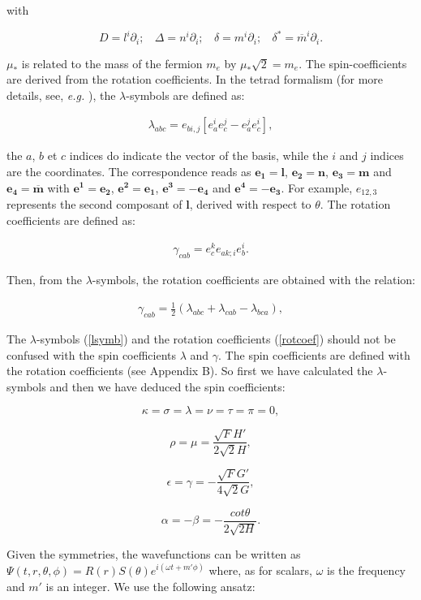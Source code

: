 \documentclass[twocolumn,amsmath,amssymb,prl,10pt,nofootinbib,superscriptaddress]{revtex4}
\def\be{\begin{equation}}
\def\ee{\end{equation}}
\def\bea{\begin{eqnarray}}
\def\eea{\end{eqnarray}}
\begin{document}
\noindent with

\be 
 D =l^i \partial _i; \ \ \ \   \Delta =n^i \partial _i; \ \ \ \   \delta =m^i \partial _i; \ \   \ \   \delta ^* = \overline{m}^i \partial _i.
 \label{operator}
 \ee
 
\noindent $\mu _*$ is related to the mass of the fermion $m_e$ by $\mu _* \sqrt{2} = m_e$. The spin-coefficients are derived from the rotation coefficients. In the tetrad formalism (for more details, see, {\it e.g.} \cite{Chandrasekhar:1985kt}), the $\lambda$-symbols are defined as: 


\bea 
\lambda  _{abc} = e_{b i, j} [ e_a^i e_c^j - e_a^j e_c^i ],
\label{lsymb}
 \eea
 
\noindent the $a$, $b$ et $c$ indices do indicate the vector of the basis, while the $i$ and $j$ indices are the coordinates. The correspondence reads as $\bm{e_1}=\bm{l}$, $\bm{e_2}=\bm{n}$, $\bm{e_3}=\bm{m}$ and $\bm{e_4}=\bm{\overline{m}}$ with $\bm{e^1}=\bm{e_2}$, $\bm{e^2}=\bm{e_1}$, $\bm{e^3}=-\bm{e_4}$ and $\bm{e^4}=-\bm{e_3}$.  For example, $e_{1 2, 3}$ represents the second composant of $\textbf{l}$, derived with respect to $\theta$. The rotation coefficients are defined as:

\bea 
\gamma  _{cab} = e_c^k e_{a k;i} e_b^i.
\label{rotcoef}
 \eea

\noindent Then, from the $\lambda$-symbols, the rotation coefficients are obtained with the relation:

\bea 
\gamma  _{cab} = \frac{1}{2}( \lambda  _{abc}+\lambda  _{cab}- \lambda  _{bca}),
 \eea

The $\lambda$-symbols (\ref{lsymb}) and the rotation coefficients (\ref{rotcoef}) should not be confused with the spin coefficients $\lambda$ and $\gamma$. The spin coefficients are defined with the rotation coefficients (see Appendix B). So first we have calculated the $\lambda$-symbols and then we have deduced the spin coefficients:

\be 
 \kappa = \sigma = \lambda = \nu = \tau = \pi =0,
 \ee
 
 \be 
 \rho = \mu =\frac{\sqrt{F} H'}{2 \sqrt{2} H},
 \ee
 
 
  \be 
 \epsilon =  \gamma =- \frac{\sqrt{F} G'}{4  \sqrt{2} G},
 \ee
 
 \be 
 \alpha = -\beta = - \frac{cot \theta}{2 \sqrt{2 H}}.
 \ee
 

Given the symmetries, the wavefunctions can be written as $\Psi (t, r, \theta, \phi) = R(r) S(\theta)e^{i(\omega t+m' \phi)}$ where, as for scalars, $\omega$ is the frequency and $m'$ is an integer. We use the following ansatz:
 
\end{document}
